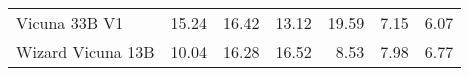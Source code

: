 \begin{table}[!htbp]
\begin{tabular}{l|rrr|rrr}
Vicuna 33B V1 & {\cellcolor[HTML]{E94B9C}} \color[HTML]{F1F1F1} 15.24 & {\cellcolor[HTML]{CD238F}} \color[HTML]{F1F1F1} 16.42 & {\cellcolor[HTML]{FA97B2}} \color[HTML]{000000} 13.12 & {\cellcolor[HTML]{00441B}} \color[HTML]{F1F1F1} 19.59 & {\cellcolor[HTML]{CCECE6}} \color[HTML]{000000} 7.15 & {\cellcolor[HTML]{D9F1F0}} \color[HTML]{000000} 6.07 \\
Wizard Vicuna 13B & {\cellcolor[HTML]{FDDDDA}} \color[HTML]{000000} 10.04 & {\cellcolor[HTML]{D22891}} \color[HTML]{F1F1F1} 16.28 & {\cellcolor[HTML]{CA208D}} \color[HTML]{F1F1F1} 16.52 & {\cellcolor[HTML]{AADFD3}} \color[HTML]{000000} 8.53 & {\cellcolor[HTML]{B8E4DB}} \color[HTML]{000000} 7.98 & {\cellcolor[HTML]{D1EEE9}} \color[HTML]{000000} 6.77 \\

\bottomrule
\end{tabular}
            
\end{table}
